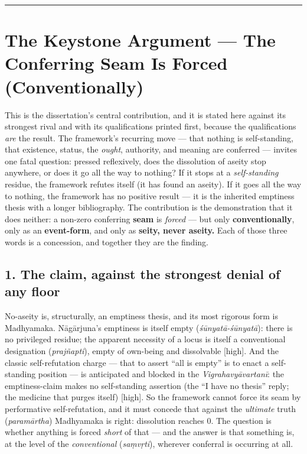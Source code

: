 \documentclass[11pt]{article}
\begin{document}
\medskip\noindent\rule{\linewidth}{0.3pt}\medskip

\section*{The Keystone Argument — The Conferring Seam Is Forced (Conventionally)}

This is the dissertation's central contribution, and it is stated here against its strongest rival and with its qualifications printed first, because the qualifications \emph{are} the result. The framework's recurring move — that nothing is self-standing, that existence, status, the \emph{ought}, authority, and meaning are conferred — invites one fatal question: pressed reflexively, does the dissolution of aseity stop anywhere, or does it go all the way to nothing? If it stops at a \emph{self-standing} residue, the framework refutes itself (it has found an aseity). If it goes all the way to nothing, the framework has no positive result — it is the inherited emptiness thesis with a longer bibliography. The contribution is the demonstration that it does neither: a non-zero conferring \textbf{seam} is \emph{forced} — but only \textbf{conventionally}, only as an \textbf{event-form}, and only as \textbf{seity, never aseity.} Each of those three words is a concession, and together they are the finding.

\subsection*{1. The claim, against the strongest denial of any floor}

No-aseity is, structurally, an emptiness thesis, and its most rigorous form is Madhyamaka. Nāgārjuna's emptiness is itself empty (\emph{śūnyatā-śūnyatā}): there is no privileged residue; the apparent necessity of a locus is itself a conventional designation (\emph{prajñapti}), empty of own-being and dissolvable [high]. And the classic self-refutation charge — that to assert ``all is empty'' is to enact a self-standing position — is anticipated and blocked in the \emph{Vigrahavyāvartanī}: the emptiness-claim makes no self-standing assertion (the ``I have no thesis'' reply; the medicine that purges itself) [high]. So the framework cannot force its seam by performative self-refutation, and it must concede that against the \emph{ultimate} truth (\emph{paramārtha}) Madhyamaka is right: dissolution reaches 0. The question is whether anything is forced \emph{short} of that — and the answer is that something is, at the level of the \emph{conventional} (\emph{saṃvṛti}), wherever conferral is occurring at all.
\end{document}
